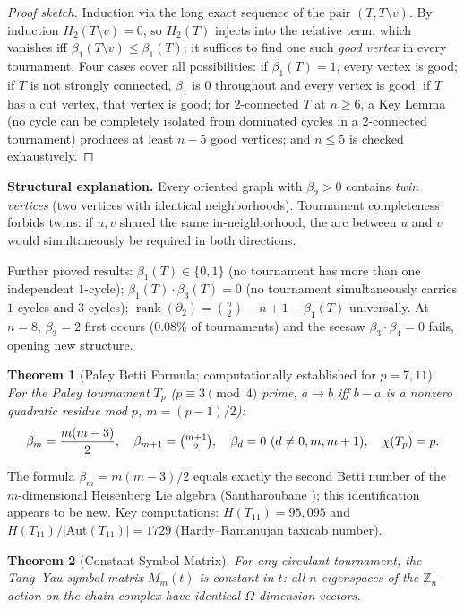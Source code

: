 \documentclass[11pt,reqno]{amsart}
\theoremstyle{plain}
\newtheorem{thm}{Theorem}[section]
\theoremstyle{definition}
\theoremstyle{remark}
\DeclareMathOperator{\rank}{rank}
\begin{document}
\begin{proof}[Proof sketch]
Induction via the long exact sequence of the pair $(T,T\setminus v)$.
By induction $H_2(T\setminus v)=0$, so $H_2(T)$ injects into the relative term,
which vanishes iff $\beta_1(T\setminus v)\le\beta_1(T)$; it suffices to find
one such \emph{good vertex} in every tournament.  Four cases cover all
possibilities: if $\beta_1(T)=1$, every vertex is good; if $T$ is not strongly
connected, $\beta_1$ is $0$ throughout and every vertex is good; if $T$ has a
cut vertex, that vertex is good; for $2$-connected $T$ at $n\ge 6$, a Key Lemma
(no cycle can be completely isolated from dominated cycles in a $2$-connected
tournament) produces at least $n-5$ good vertices; and $n\le 5$ is checked
exhaustively.
\end{proof}

\noindent\textbf{Structural explanation.}
Every oriented graph with $\beta_2>0$ contains \emph{twin vertices} (two
vertices with identical neighborhoods).  Tournament completeness forbids twins:
if $u,v$ shared the same in-neighborhood, the arc between $u$ and $v$ would
simultaneously be required in both directions.

\smallskip
Further proved results:
$\beta_1(T)\in\{0,1\}$ (no tournament has more than one independent $1$-cycle);
$\beta_1(T)\cdot\beta_3(T)=0$ (no tournament simultaneously carries $1$-cycles
and $3$-cycles);
$\rank(\partial_2)=\binom{n}{2}-n+1-\beta_1(T)$ universally.
At $n=8$, $\beta_3=2$ first occurs ($0.08\%$ of tournaments) and the
seesaw $\beta_3\cdot\beta_4=0$ fails, opening new structure.

\begin{thm}[Paley Betti Formula; computationally established for $p=7,11$]%
\label{thm:paley}
For the Paley tournament $T_p$ \textup{(}$p\equiv 3\pmod 4$ prime,
$a\to b$ iff $b-a$ is a nonzero quadratic residue mod $p$, $m=(p-1)/2$\textup{)}:
\[
\beta_m = \frac{m(m-3)}{2},\quad
\beta_{m+1}=\tbinom{m+1}{2},\quad
\beta_d=0\ (d\ne 0,m,m+1),\quad
\chi(T_p)=p.
\]
\end{thm}

The formula $\beta_m=m(m-3)/2$ equals exactly the second Betti number of the
$m$-dimensional Heisenberg Lie algebra (Santharoubane \cite{S83}); this
identification appears to be new.
Key computations: $H(T_{11})=95{,}095$ and
$H(T_{11})/|\mathrm{Aut}(T_{11})|=1729$ (Hardy--Ramanujan taxicab number).

\begin{thm}[Constant Symbol Matrix]\label{thm:csm}
For any circulant tournament, the Tang--Yau symbol matrix $M_m(t)$
\textup{\cite{TY26}} is constant in $t$: all $n$ eigenspaces of the
$\mathbb{Z}_n$-action on the chain complex have identical $\Omega$-dimension
vectors.
\end{thm}
\end{document}
